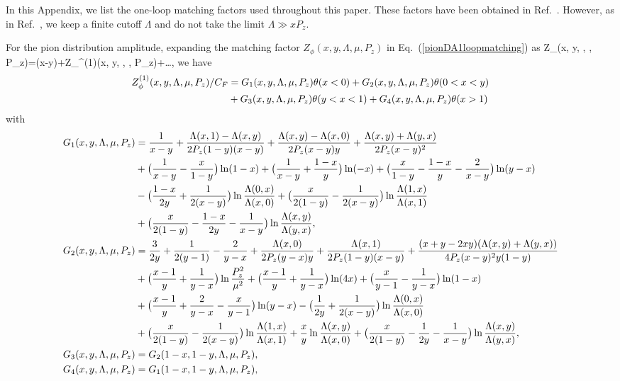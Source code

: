 
In this Appendix, we list the one-loop matching factors used throughout this paper. These factors have been obtained in Ref.~\cite{Ji:2015qla}. However, as in Ref.~\cite{Chen:2016utp}, we keep a finite cutoff $\Lambda$ and do not take the limit $\Lambda\gg x P_z$.

For the pion distribution amplitude, expanding the matching factor $Z_\phi(x, y, \Lambda, \mu, P_z)$ in Eq.~(\ref{pionDA1loopmatching}) as
\beq
Z_\phi(x, y, \Lambda, \mu, P_z)=\delta(x-y)+Z_\phi^{(1)}(x, y, \Lambda, \mu, P_z)+\dots,
\eeq
we have
\begin{align}\label{DAmatfac}
Z_\phi^{(1)}(x, y, \Lambda, \mu, P_z)/C_F&=G_1(x, y, \Lambda, \mu, P_z)\theta(x<0)+G_2(x, y, \Lambda, \mu, P_z)\theta(0<x<y)\nonumber\\
&+G_3(x, y, \Lambda, \mu, P_z)\theta(y<x<1)+G_4(x, y, \Lambda, \mu, P_z)\theta(x>1)
\end{align}
with
\begin{align}\label{DAmatfac1}
G_1(x, y, \Lambda, \mu, P_z)&=\frac{1}{x-y}+\frac{\Lambda(x,1)-\Lambda(x,y)}{2P_z(1-y)(x-y)}+\frac{\Lambda(x,y)-\Lambda(x,0)}{2P_z (x-y)y}+\frac{\Lambda(x,y)+\Lambda(y,x)}{2P_z(x-y)^2}\nonumber\\
&+\big(\frac{1}{x-y}-\frac{x}{1-y}\big)\ln(1-x)+\big(\frac{1}{x-y}+\frac{1-x}{y}\big)\ln(-x)+\big(\frac{x}{1-y}-\frac{1-x}{y}-\frac{2}{x-y}\big)\ln(y-x)\nonumber\\
&-\big(\frac{1-x}{2y}+\frac{1}{2(x-y)}\big)\ln\frac{\Lambda(0,x)}{\Lambda(x,0)}+\big(\frac{x}{2(1-y)}-\frac{1}{2(x-y)}\big)\ln\frac{\Lambda(1,x)}{\Lambda(x,1)}\nonumber\\
&+\big(\frac{x}{2(1-y)}-\frac{1-x}{2y}-\frac{1}{x-y}\big)\ln\frac{\Lambda(x,y)}{\Lambda(y,x)},\nonumber\\
G_2(x, y, \Lambda, \mu, P_z)&=\frac{3}{2y}+\frac{1}{2(y-1)}-\frac{2}{y-x}+\frac{\Lambda(x,0)}{2P_z(y-x)y}+\frac{\Lambda(x,1)}{2P_z(1-y)(x-y)}+\frac{(x+y-2xy)(\Lambda(x,y)+\Lambda(y,x))}{4P_z(x-y)^2 y(1-y)}\nonumber\\
&+\big(\frac{x-1}{y}+\frac{1}{y-x}\big)\ln\frac{P_z^2}{\mu^2}+\big(\frac{x-1}{y}+\frac{1}{y-x}\big)\ln(4x)
+\big(\frac{x}{y-1}-\frac{1}{y-x}\big)\ln(1-x)\nonumber\\
&+\big(\frac{x-1}{y}+\frac{2}{y-x}-\frac{x}{y-1}\big)\ln(y-x)-\big(\frac{1}{2y}+\frac{1}{2(x-y)}\big)\ln\frac{\Lambda(0,x)}{\Lambda(x,0)}\nonumber\\
&+\big(\frac{x}{2(1-y)}-\frac{1}{2(x-y)}\big)\ln\frac{\Lambda(1,x)}{\Lambda(x,1)}+\frac{x}{y}\ln\frac{\Lambda(x,y)}{\Lambda(x,0)}+\big(\frac{x}{2(1-y)}-\frac{1}{2y}-\frac{1}{x-y}\big)\ln\frac{\Lambda(x,y)}{\Lambda(y,x)},\nonumber\\
G_3(x, y, \Lambda, \mu, P_z)&=G_2(1-x, 1-y, \Lambda, \mu, P_z),\nonumber\\
G_4(x, y, \Lambda, \mu, P_z)&=G_1(1-x, 1-y, \Lambda, \mu, P_z),
\end{align}
